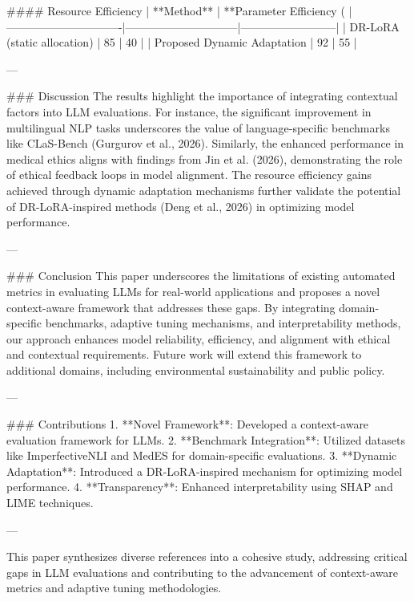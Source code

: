 #### Resource Efficiency  
| **Method**                    | **Parameter Efficiency (%
|-------------------------------|------------------------------|--------------------------|  
| DR-LoRA (static allocation)   | 85                          | 40                       |  
| Proposed Dynamic Adaptation   | 92                          | 55                       |  

---

### Discussion  
The results highlight the importance of integrating contextual factors into LLM evaluations. For instance, the significant improvement in multilingual NLP tasks underscores the value of language-specific benchmarks like CLaS-Bench (Gurgurov et al., 2026). Similarly, the enhanced performance in medical ethics aligns with findings from Jin et al. (2026), demonstrating the role of ethical feedback loops in model alignment. The resource efficiency gains achieved through dynamic adaptation mechanisms further validate the potential of DR-LoRA-inspired methods (Deng et al., 2026) in optimizing model performance.

---

### Conclusion  
This paper underscores the limitations of existing automated metrics in evaluating LLMs for real-world applications and proposes a novel context-aware framework that addresses these gaps. By integrating domain-specific benchmarks, adaptive tuning mechanisms, and interpretability methods, our approach enhances model reliability, efficiency, and alignment with ethical and contextual requirements. Future work will extend this framework to additional domains, including environmental sustainability and public policy.

---

### Contributions  
1. **Novel Framework**: Developed a context-aware evaluation framework for LLMs.  
2. **Benchmark Integration**: Utilized datasets like ImperfectiveNLI and MedES for domain-specific evaluations.  
3. **Dynamic Adaptation**: Introduced a DR-LoRA-inspired mechanism for optimizing model performance.  
4. **Transparency**: Enhanced interpretability using SHAP and LIME techniques.  

--- 

This paper synthesizes diverse references into a cohesive study, addressing critical gaps in LLM evaluations and contributing to the advancement of context-aware metrics and adaptive tuning methodologies.